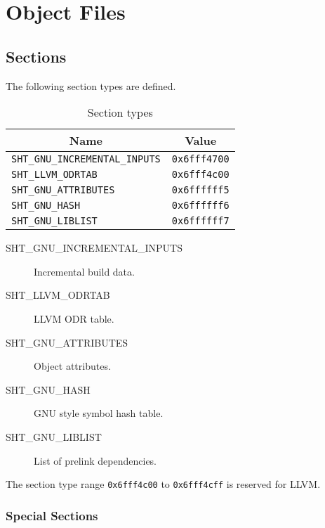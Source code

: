 
\chapter{Object Files}

\section{Sections}

The following section types are defined.

\begin{table}[H]
\Hrule
  \caption{Section types}
  \begin{center}
    \begin{tabular}[t]{l|l}
      \multicolumn{1}{c}{Name} & \multicolumn{1}{c}{Value} \\
      \hline
      \texttt{SHT_GNU_INCREMENTAL_INPUTS} & \texttt{0x6fff4700} \\
      \texttt{SHT_LLVM_ODRTAB} & \texttt{0x6fff4c00} \\
      \texttt{SHT_GNU_ATTRIBUTES} & \texttt{0x6ffffff5} \\
      \texttt{SHT_GNU_HASH} & \texttt{0x6ffffff6} \\
      \texttt{SHT_GNU_LIBLIST} & \texttt{0x6ffffff7} \\
  \end{tabular}
 \end{center}
\Hrule
\end{table}

\begin{description}
  \item[SHT_GNU_INCREMENTAL_INPUTS] Incremental build data.
  \item[SHT_LLVM_ODRTAB] LLVM ODR table.
  \item[SHT_GNU_ATTRIBUTES] Object attributes.
  \item[SHT_GNU_HASH] GNU style symbol hash table.
  \item[SHT_GNU_LIBLIST] List of prelink dependencies.
\end{description}

The section type range \texttt{0x6fff4c00} to \texttt{0x6fff4cff}
is reserved for LLVM.

\subsection{Special Sections}

